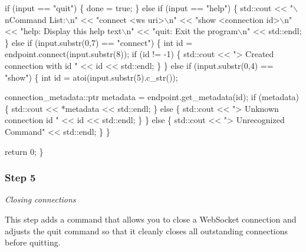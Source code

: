 \begin{DoxyCode}
        \textcolor{keywordflow}{if} (input == \textcolor{stringliteral}{"quit"}) \{
            done = \textcolor{keyword}{true};
        \} \textcolor{keywordflow}{else} \textcolor{keywordflow}{if} (input == \textcolor{stringliteral}{"help"}) \{
            std::cout
                << \textcolor{stringliteral}{"\(\backslash\)nCommand List:\(\backslash\)n"}
                << \textcolor{stringliteral}{"connect <ws uri>\(\backslash\)n"}
                << \textcolor{stringliteral}{"show <connection id>\(\backslash\)n"}
                << \textcolor{stringliteral}{"help: Display this help text\(\backslash\)n"}
                << \textcolor{stringliteral}{"quit: Exit the program\(\backslash\)n"}
                << std::endl;
        \} \textcolor{keywordflow}{else} \textcolor{keywordflow}{if} (input.substr(0,7) == \textcolor{stringliteral}{"connect"}) \{
            \textcolor{keywordtype}{int} \textcolor{keywordtype}{id} = endpoint.connect(input.substr(8));
            \textcolor{keywordflow}{if} (\textcolor{keywordtype}{id} != -1) \{
                std::cout << \textcolor{stringliteral}{"> Created connection with id "} << \textcolor{keywordtype}{id} << std::endl;
            \}
        \} \textcolor{keywordflow}{else} \textcolor{keywordflow}{if} (input.substr(0,4) == \textcolor{stringliteral}{"show"}) \{
            \textcolor{keywordtype}{int} \textcolor{keywordtype}{id} = atoi(input.substr(5).c\_str());

            connection\_metadata::ptr metadata = endpoint.get\_metadata(\textcolor{keywordtype}{id});
            \textcolor{keywordflow}{if} (metadata) \{
                std::cout << *metadata << std::endl;
            \} \textcolor{keywordflow}{else} \{
                std::cout << \textcolor{stringliteral}{"> Unknown connection id "} << \textcolor{keywordtype}{id} << std::endl;
            \}
        \} \textcolor{keywordflow}{else} \{
            std::cout << \textcolor{stringliteral}{"> Unrecognized Command"} << std::endl;
        \}
    \}

    \textcolor{keywordflow}{return} 0;
\}
\end{DoxyCode}


\subsubsection*{Step 5}

{\itshape Closing connections}

This step adds a command that allows you to close a Web\+Socket connection and adjusts the quit command so that it cleanly closes all outstanding connections before quitting.

